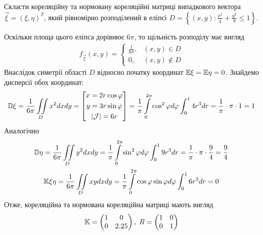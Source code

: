 \begin{example}
    Скласти кореляційну та нормовану кореляційні матриці випадкового вектора $\vec{\xi} = (\xi, \eta)^T$,
    який рівномірно розподілений в еліпсі $D = \left\{(x, y) : \frac{x^2}{4} + \frac{y^2}{9} \leq 1 \right\}$.

    Оскільки площа цього еліпса дорівнює $6\pi$, то щільність розподілу має вигляд
    \begin{gather*}
        f_{\vec{\xi}}(x, y) = \begin{cases}
            \frac{1}{6\pi}, & (x, y) \in D \\
            0, & (x, y) \notin D
        \end{cases}
    \end{gather*}
    Внаслідок симетрії області $D$ відносно початку координат $\mathbb{E}\xi = \mathbb{E}\eta = 0$.
    Знайдемо дисперсії обох координат:
    \begin{gather*}
        \mathbb{D}\xi = \frac{1}{6\pi} \iint\limits_D x^2 dx dy =
        \left[ \begin{gathered}x = 2 r\cos\varphi \\ y = 3 r\sin\varphi \\ |\mathcal{J}| = 6r\end{gathered}\right] =
        \frac{1}{\pi} \int\limits_0^{2\pi}\cos^2 \varphi d\varphi \int_0^1 4 r^3 dr =
        \frac{1}{\pi} \cdot \pi \cdot 1 = 1
    \end{gather*}
    Аналогічно
    \begin{gather*}
        \mathbb{D}\eta = \frac{1}{6\pi} \iint\limits_D y^2 dx dy =
        \frac{1}{\pi} \int\limits_0^{2\pi}\sin^2 \varphi d\varphi \int_0^1 9 r^3 dr =
        \frac{1}{\pi} \cdot \pi \cdot \frac{9}{4} = \frac{9}{4} 
        \\
        \mathbb{K}\xi\eta = \frac{1}{6\pi}\iint\limits_D xy dx dy = 
        \frac{1}{\pi} \int\limits_0^{2\pi} \cos\varphi \sin\varphi d\varphi \int_0^1 6 r^3 dr = 0
    \end{gather*}
    Отже, кореляційна та нормована кореляційна матриці мають вигляд
    \begin{gather*}
        \mathbb{K} = \begin{pmatrix}
            1 & 0 \\
            0 & 2.25
        \end{pmatrix}, \;
        R = \begin{pmatrix}
            1 & 0 \\
            0 & 1
        \end{pmatrix}
    \end{gather*}
\end{example}
